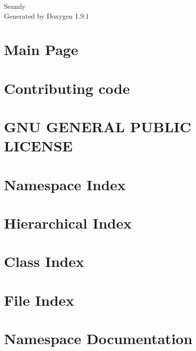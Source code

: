 \let\mypdfximage\pdfximage\def\pdfximage{\immediate\mypdfximage}\documentclass[twoside]{book}
\newcommand{\+}{\discretionary{\mbox{\scriptsize$\hookleftarrow$}}{}{}}
\newcommand{\clearemptydoublepage}{%
  \newpage{\pagestyle{empty}\cleardoublepage}%
}
\begin{document}
\raggedbottom

\hypersetup{pageanchor=false,
             bookmarksnumbered=true,
             pdfencoding=unicode
            }
\begin{titlepage}
\vspace*{7cm}
\begin{center}%
{\Large Seamly }\\
\vspace*{1cm}
{\large Generated by Doxygen 1.9.1}\\
\end{center}
\end{titlepage}
\clearemptydoublepage
{}
\tableofcontents
\clearemptydoublepage
{}
\hypersetup{pageanchor=true}

\chapter{Main Page}
\label{index}\hypertarget{index}{}
\chapter{Contributing code}
\label{md_CONTRIBUTING}

\chapter{GNU GENERAL PUBLIC LICENSE}
\label{md_LICENSE}

\chapter{Namespace Index}

\chapter{Hierarchical Index}

\chapter{Class Index}

\chapter{File Index}

\chapter{Namespace Documentation}







\end{document}
